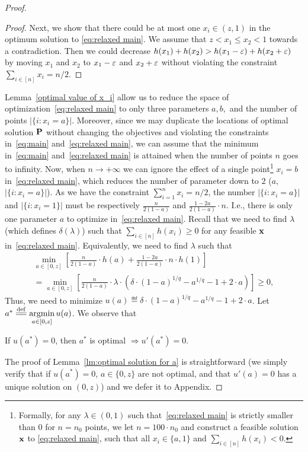 \begin{proof}
\begin{proof}
Next, we show that there could be at most one $x_i\in(z,1)$ in the optimum solution to \eqref{eq:relaxed main}. We assume that $z<x_1\leq x_2<1$ towards a contradiction. Then we could decrease $h(x_1)+h(x_2)>h(x_1-\varepsilon)+h(x_2+\varepsilon)$ by moving $x_1$ and $x_2$ to $x_1-\varepsilon$ and $x_2+\varepsilon$ without violating the constraint $\sum_{i\in[n]}x_i=n/2$.
\end{proof}
Lemma~\ref{optimal value of x_i} allow us to reduce the space of optimization~\eqref{eq:relaxed main} to only three parameters $a,b,$ and the number of points $|\{i: x_i=a\}|$. Moreover, since we may duplicate the locations of optimal solution $\mathbf{P}$ without changing the objectives and violating the constraints in~\eqref{eq:main} and~\eqref{eq:relaxed main}, we can assume that the minimum in~\eqref{eq:main} and~\eqref{eq:relaxed main} is attained when the number of points $n$ goes to infinity. Now, when $n\to+\infty$ we can ignore the effect of a single point\footnote{Formally, for any $\lambda\in(0,1)$ such that~\eqref{eq:relaxed main} is strictly smaller than $0$ for $n=n_0$ points, we let $n=100\cdot n_0$ and construct a feasible solution $\mathbf{x}$ to \eqref{eq:relaxed main}, such that all $x_i\in\{a,1\}$ and $\sum_{i\in[n]}h(x_i)<0$.} $x_i=b$ in~\eqref{eq:relaxed main}, which reduces the number of parameter down to $2$ ($a$, $|\{i: x_i=a\}|$). As we have the constraint $\sum_{i=1}^n x_i = n/2$, the number $|\{i: x_i=a\}|$ and $|\{i: x_i=1\}|$ must be respectively $\frac{n}{2(1-a)}$ and $\frac{1-2a}{2(1-a)}\cdot n$. 
I.e., there is only one parameter $a$ to optimize in~\eqref{eq:relaxed main}. Recall that we need to find $\lambda$ (which defines $\delta(\lambda)$) such that   $\sum_{i\in[n]}h(x_i)\ge 0$ for any feasible $\mathbf{x}$
in~\eqref{eq:relaxed main}.
Equivalently, we need to find $\lambda$ such that
\begin{align}
    \label{eq: optimization over a}   &\min_{a\in[0,z]}\left[\frac{n}{2(1-a)}\cdot h(a) + \frac{1-2a}{2(1-a)}\cdot n\cdot h(1)\right]&\\
    &=\min_{a\in[0,z]}\left[\frac{n}{2(1-a)}\cdot\lambda\cdot\left(\delta\cdot(1-a)^{1/q}-a^{1/q}-1+2\cdot a\right)\right]\ge 0,\nonumber
\end{align}
Thus, we need to minimize $u(a)\eqdef\delta\cdot(1-a)^{1/q}-a^{1/q}-1+2\cdot a$.
Let $a^*\overset{\mathrm{def}}{=\mathrel{\mkern-3mu}=} \mathop{\rm argmin}\limits_{a\in[0,z]} u(a)$. We observe that 
\begin{lemma}
    \label{lm:optimal solution for a}
    If $u(a^*)=0$, then $a^*$ is optimal $\Rightarrow u'(a^*)=0$.
\end{lemma}
The proof of Lemma~\ref{lm:optimal solution for a} is straightforward (we simply verify that if $u(a^*)=0$, $a\in\{0,z\}$ are not optimal, and that $u'(a)=0$ has a unique solution on $(0,z)$) and we defer it to Appendix. 


\end{proof}

